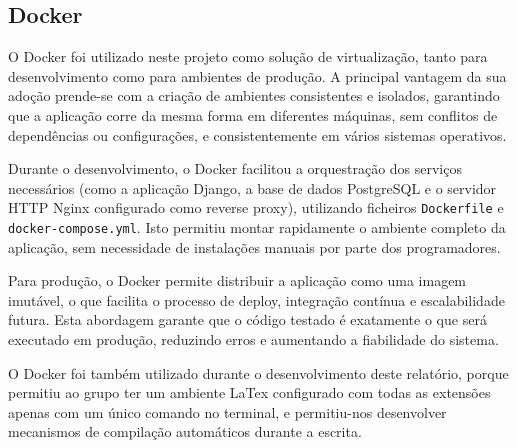 \subsection{Docker}

O Docker foi utilizado neste projeto como solução de virtualização, tanto para desenvolvimento como para ambientes de produção. A principal vantagem da sua adoção prende-se com a criação de ambientes consistentes e isolados, garantindo que a aplicação corre da mesma forma em diferentes máquinas, sem conflitos de dependências ou configurações, e consistentemente em vários sistemas operativos.

Durante o desenvolvimento, o Docker facilitou a orquestração dos serviços necessários (como a aplicação Django, a base de dados PostgreSQL e o servidor HTTP Nginx configurado como reverse proxy), utilizando ficheiros \texttt{Dockerfile} e \texttt{docker-compose.yml}. Isto permitiu montar rapidamente o ambiente completo da aplicação, sem necessidade de instalações manuais por parte dos programadores.

Para produção, o Docker permite distribuir a aplicação como uma imagem imutável, o que facilita o processo de deploy, integração contínua e escalabilidade futura. Esta abordagem garante que o código testado é exatamente o que será executado em produção, reduzindo erros e aumentando a fiabilidade do sistema.

O Docker foi também utilizado durante o desenvolvimento deste relatório, porque permitiu ao grupo ter um ambiente LaTex configurado com todas as extensões apenas com um único comando no terminal, e permitiu-nos desenvolver mecanismos de compilação automáticos durante a escrita. 